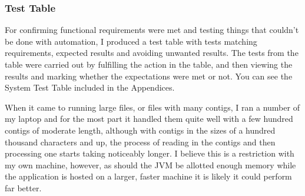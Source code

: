 \subsubsection{Test Table}
For confirming functional requirements were met and testing things that couldn't be done with automation, I produced a test table with tests matching requirements, expected results and avoiding unwanted results. The tests from the table were carried out by fulfilling the action in the table, and then viewing the results and marking whether the expectations were met or not. You can see the System Test Table included in the Appendices.

When it came to running large files, or files with many contigs, I ran a number of my laptop and for the most part it handled them quite well with a few hundred contigs of moderate length, although with contigs in the sizes of a hundred thousand characters and up, the process of reading in the contigs and then processing one starts taking noticeably longer. I believe this is a restriction with my own machine, however, as should the JVM be allotted enough memory while the application is hosted on a larger, faster machine it is likely it could perform far better.
